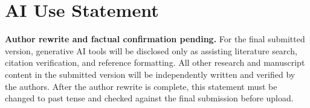 \section*{AI Use Statement}
\label{sec:ai-use}

\textbf{Author rewrite and factual confirmation pending.} For the final submitted version, generative AI tools will be disclosed only as assisting literature search, citation verification, and reference formatting. All other research and manuscript content in the submitted version will be independently written and verified by the authors. After the author rewrite is complete, this statement must be changed to past tense and checked against the final submission before upload.
